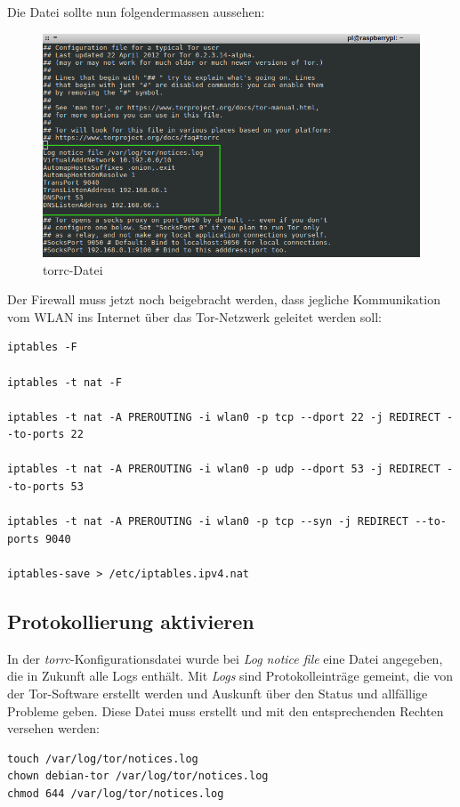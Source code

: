Die Datei sollte nun folgendermassen aussehen: 

\begin{figure}[h]
\centering
\includegraphics[scale=0.6]{images/torrc}
\caption{torrc-Datei}
\end{figure}
 	
Der Firewall muss jetzt noch beigebracht werden, dass jegliche Kommunikation vom WLAN ins Internet über das Tor-Netzwerk geleitet werden soll:

\begin{lstlisting}
iptables -F

iptables -t nat -F

iptables -t nat -A PREROUTING -i wlan0 -p tcp --dport 22 -j REDIRECT --to-ports 22

iptables -t nat -A PREROUTING -i wlan0 -p udp --dport 53 -j REDIRECT --to-ports 53

iptables -t nat -A PREROUTING -i wlan0 -p tcp --syn -j REDIRECT --to-ports 9040

iptables-save > /etc/iptables.ipv4.nat
\end{lstlisting}

\subsection{Protokollierung aktivieren}
In der \textit{torrc}-Konfigurationsdatei wurde bei \textit{Log notice file} eine Datei angegeben, die in Zukunft alle Logs enthält. Mit \textit{Logs} sind Protokolleinträge gemeint, die von der Tor-Software erstellt werden und Auskunft über den Status und allfällige Probleme geben. Diese Datei muss erstellt und mit den entsprechenden Rechten versehen werden:

\begin{lstlisting}
touch /var/log/tor/notices.log
chown debian-tor /var/log/tor/notices.log
chmod 644 /var/log/tor/notices.log
\end{lstlisting}

